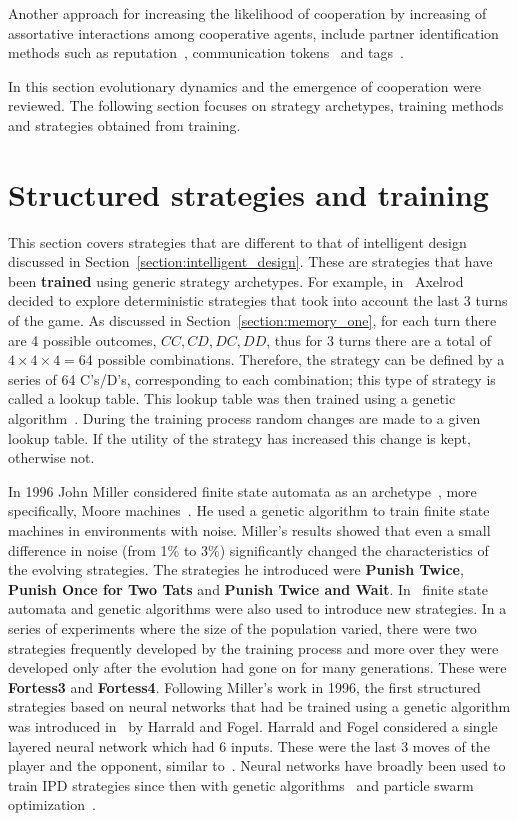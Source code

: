 Another approach for increasing the likelihood of cooperation by increasing of
assortative interactions among cooperative agents, include partner identification
methods such as reputation~\cite{Janssen2006, Nowak1998, Suzuki2005},
communication tokens~\cite{Miller2002} and tags~\cite{Choi2006, Hales2000,
Miller2002, Riolo2001}.

In this section evolutionary dynamics and the emergence of cooperation were
reviewed. The following section focuses on strategy archetypes, training methods
and strategies obtained from training.

\section{Structured strategies and training}
\label{section:structured_strategies}

This section covers strategies that are different to that of intelligent design discussed
in Section~\ref{section:intelligent_design}. These are strategies that have
been \textbf{trained} using generic strategy archetypes. For example,
in~\cite{Axelrod1987} Axelrod decided to explore deterministic strategies that
took into account the last 3 turns of the game. As discussed in
Section~\ref{section:memory_one}, for each turn there are 4 possible outcomes,
\(CC, CD, DC, DD\), thus for 3 turns there are a total of
\(4\times4\times4=64\) possible combinations. Therefore, the strategy can be
defined by a series of 64 C's/D's, corresponding to each combination; this type
of strategy is called a lookup table.
This lookup table was then trained using a
genetic algorithm~\cite{Koza1997}. During the training process random changes are made to a
given lookup table. If the utility of the strategy has increased this
change is kept, otherwise not.

In 1996 John Miller considered finite state automata as an
archetype~\cite{Miller1996}, more specifically, Moore
machines~\cite{moore1956}. He used a genetic algorithm to train finite state
machines in environments with noise. Miller's results showed that even a small
difference in noise (from 1\% to 3\%) significantly changed the characteristics
of the evolving strategies. The strategies he introduced were \textbf{Punish
Twice}, \textbf{Punish Once for Two Tats} and \textbf{Punish Twice and Wait}.
In~\cite{Ashlock2006b} finite state automata and genetic algorithms were also
used to introduce new strategies. In a series of experiments where the size of
the population varied, there were two strategies frequently developed by the
training process and more over they were developed only after the evolution had
gone on for many generations. These were \textbf{Fortess3} and
\textbf{Fortess4}.
Following Miller's work in 1996, the first structured strategies based on neural
networks that had be trained using a genetic algorithm was introduced
in~\cite{Harrald1996} by Harrald and Fogel. Harrald and Fogel considered a
single layered neural network which had 6 inputs. These were the last 3 moves of
the player and the opponent, similar to~\cite{Axelrod1987}. Neural networks have
broadly been used to train IPD strategies since then with genetic
algorithms~\cite{Ashlock2006a, Chong2005, Marks1999} and particle swarm
optimization~\cite{Franken2005}.

